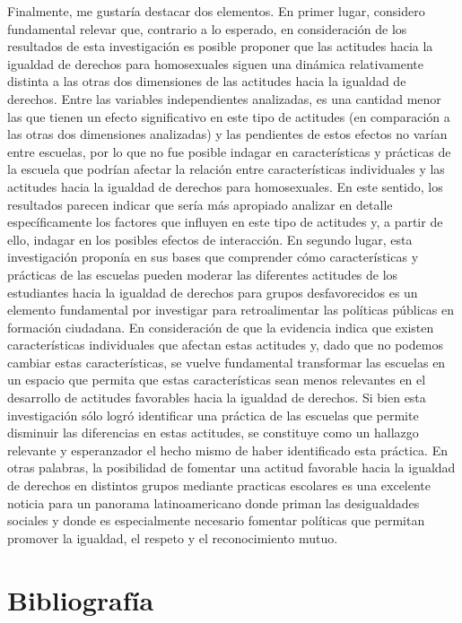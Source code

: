 \documentclass[12pt,twoside]{templates/facsothesis}
\begin{document}
Finalmente, me gustaría destacar dos elementos. En primer lugar, considero fundamental relevar que, contrario a lo esperado, en consideración de los resultados de esta investigación es posible proponer que las actitudes hacia la igualdad de derechos para homosexuales siguen una dinámica relativamente distinta a las otras dos dimensiones de las actitudes hacia la igualdad de derechos. Entre las variables independientes analizadas, es una cantidad menor las que tienen un efecto significativo en este tipo de actitudes (en comparación a las otras dos dimensiones analizadas) y las pendientes de estos efectos no varían entre escuelas, por lo que no fue posible indagar en características y prácticas de la escuela que podrían afectar la relación entre características individuales y las actitudes hacia la igualdad de derechos para homosexuales. En este sentido, los resultados parecen indicar que sería más apropiado analizar en detalle específicamente los factores que influyen en este tipo de actitudes y, a partir de ello, indagar en los posibles efectos de interacción. En segundo lugar, esta investigación proponía en sus bases que comprender cómo características y prácticas de las escuelas pueden moderar las diferentes actitudes de los estudiantes hacia la igualdad de derechos para grupos desfavorecidos es un elemento fundamental por investigar para retroalimentar las políticas públicas en formación ciudadana. En consideración de que la evidencia indica que existen características individuales que afectan estas actitudes y, dado que no podemos cambiar estas características, se vuelve fundamental transformar las escuelas en un espacio que permita que estas características sean menos relevantes en el desarrollo de actitudes favorables hacia la igualdad de derechos. Si bien esta investigación sólo logró identificar una práctica de las escuelas que permite disminuir las diferencias en estas actitudes, se constituye como un hallazgo relevante y esperanzador el hecho mismo de haber identificado esta práctica. En otras palabras, la posibilidad de fomentar una actitud favorable hacia la igualdad de derechos en distintos grupos mediante practicas escolares es una excelente noticia para un panorama latinoamericano donde priman las desigualdades sociales y donde es especialmente necesario fomentar políticas que permitan promover la igualdad, el respeto y el reconocimiento mutuo.

\hypertarget{bibliografuxeda}{%
\chapter*{Bibliografía}\label{bibliografuxeda}}
\end{document}
